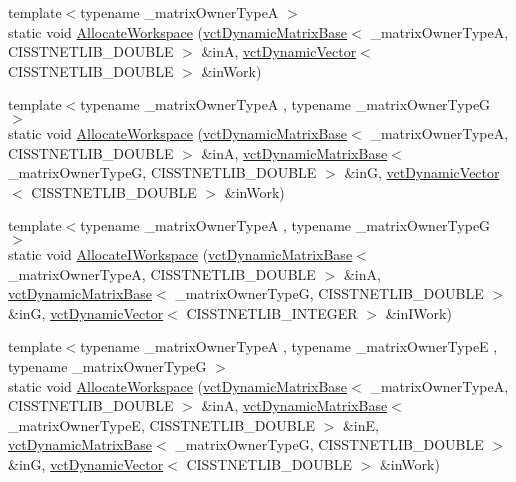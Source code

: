 \begin{DoxyCompactItemize}
\item 
{\footnotesize template$<$typename \+\_\+matrix\+Owner\+Type\+A $>$ }\\static void \hyperlink{classnmr_l_sq_lin_solution_dynamic_ac35f30dce8922ce26c8e76c66b573e6f}{Allocate\+Workspace} (\hyperlink{classvct_dynamic_matrix_base}{vct\+Dynamic\+Matrix\+Base}$<$ \+\_\+matrix\+Owner\+Type\+A, C\+I\+S\+S\+T\+N\+E\+T\+L\+I\+B\+\_\+\+D\+O\+U\+B\+L\+E $>$ \&in\+A, \hyperlink{classvct_dynamic_vector}{vct\+Dynamic\+Vector}$<$ C\+I\+S\+S\+T\+N\+E\+T\+L\+I\+B\+\_\+\+D\+O\+U\+B\+L\+E $>$ \&in\+Work)
\item 
{\footnotesize template$<$typename \+\_\+matrix\+Owner\+Type\+A , typename \+\_\+matrix\+Owner\+Type\+G $>$ }\\static void \hyperlink{classnmr_l_sq_lin_solution_dynamic_a3604dc4bd8e6c7407c0d93458eb39f9b}{Allocate\+Workspace} (\hyperlink{classvct_dynamic_matrix_base}{vct\+Dynamic\+Matrix\+Base}$<$ \+\_\+matrix\+Owner\+Type\+A, C\+I\+S\+S\+T\+N\+E\+T\+L\+I\+B\+\_\+\+D\+O\+U\+B\+L\+E $>$ \&in\+A, \hyperlink{classvct_dynamic_matrix_base}{vct\+Dynamic\+Matrix\+Base}$<$ \+\_\+matrix\+Owner\+Type\+G, C\+I\+S\+S\+T\+N\+E\+T\+L\+I\+B\+\_\+\+D\+O\+U\+B\+L\+E $>$ \&in\+G, \hyperlink{classvct_dynamic_vector}{vct\+Dynamic\+Vector}$<$ C\+I\+S\+S\+T\+N\+E\+T\+L\+I\+B\+\_\+\+D\+O\+U\+B\+L\+E $>$ \&in\+Work)
\item 
{\footnotesize template$<$typename \+\_\+matrix\+Owner\+Type\+A , typename \+\_\+matrix\+Owner\+Type\+G $>$ }\\static void \hyperlink{classnmr_l_sq_lin_solution_dynamic_a7d16698dad9e988a4cc8762829f2eac2}{Allocate\+I\+Workspace} (\hyperlink{classvct_dynamic_matrix_base}{vct\+Dynamic\+Matrix\+Base}$<$ \+\_\+matrix\+Owner\+Type\+A, C\+I\+S\+S\+T\+N\+E\+T\+L\+I\+B\+\_\+\+D\+O\+U\+B\+L\+E $>$ \&in\+A, \hyperlink{classvct_dynamic_matrix_base}{vct\+Dynamic\+Matrix\+Base}$<$ \+\_\+matrix\+Owner\+Type\+G, C\+I\+S\+S\+T\+N\+E\+T\+L\+I\+B\+\_\+\+D\+O\+U\+B\+L\+E $>$ \&in\+G, \hyperlink{classvct_dynamic_vector}{vct\+Dynamic\+Vector}$<$ C\+I\+S\+S\+T\+N\+E\+T\+L\+I\+B\+\_\+\+I\+N\+T\+E\+G\+E\+R $>$ \&in\+I\+Work)
\item 
{\footnotesize template$<$typename \+\_\+matrix\+Owner\+Type\+A , typename \+\_\+matrix\+Owner\+Type\+E , typename \+\_\+matrix\+Owner\+Type\+G $>$ }\\static void \hyperlink{classnmr_l_sq_lin_solution_dynamic_a4724f0d104ab5af54e5213c9c7cb7d08}{Allocate\+Workspace} (\hyperlink{classvct_dynamic_matrix_base}{vct\+Dynamic\+Matrix\+Base}$<$ \+\_\+matrix\+Owner\+Type\+A, C\+I\+S\+S\+T\+N\+E\+T\+L\+I\+B\+\_\+\+D\+O\+U\+B\+L\+E $>$ \&in\+A, \hyperlink{classvct_dynamic_matrix_base}{vct\+Dynamic\+Matrix\+Base}$<$ \+\_\+matrix\+Owner\+Type\+E, C\+I\+S\+S\+T\+N\+E\+T\+L\+I\+B\+\_\+\+D\+O\+U\+B\+L\+E $>$ \&in\+E, \hyperlink{classvct_dynamic_matrix_base}{vct\+Dynamic\+Matrix\+Base}$<$ \+\_\+matrix\+Owner\+Type\+G, C\+I\+S\+S\+T\+N\+E\+T\+L\+I\+B\+\_\+\+D\+O\+U\+B\+L\+E $>$ \&in\+G, \hyperlink{classvct_dynamic_vector}{vct\+Dynamic\+Vector}$<$ C\+I\+S\+S\+T\+N\+E\+T\+L\+I\+B\+\_\+\+D\+O\+U\+B\+L\+E $>$ \&in\+Work)

\end{DoxyCompactItemize}
